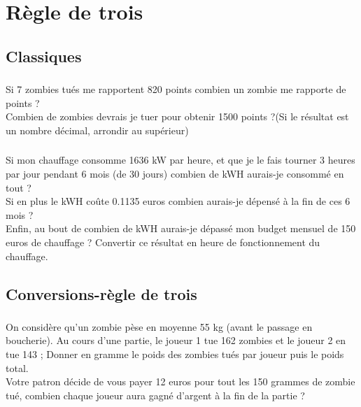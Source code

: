 \documentclass[a4paper,10pt]{article}
\newcommand{\subsub}{\subsubsection}
\newcommand{\sub}{\subsection}
\begin{document}
\section{Règle de trois }
\sub{Classiques}
\subsub{}
Si 7 zombies tués me rapportent 820 points combien un zombie me rapporte de points ?\\
Combien de zombies devrais je tuer pour obtenir 1500 points ?(Si le résultat est un nombre décimal, arrondir au supérieur)

\subsub{}
Si mon chauffage consomme 1636 kW par heure, et que je le fais tourner 3 heures par jour pendant 6 mois (de 30 jours) combien de kWH aurais-je consommé en tout ?\\
Si en plus le kWH coûte 0.1135 euros combien aurais-je dépensé à la fin de ces 6 mois ?\\
Enfin, au bout de combien de kWH aurais-je dépassé mon budget mensuel de 150 euros de chauffage ? Convertir ce résultat en heure de fonctionnement du chauffage.

\sub{Conversions-règle de trois}
\subsub{}
On considère qu'un zombie pèse en moyenne 55 kg (avant le passage en boucherie). Au cours d'une partie, le joueur 1 tue 162 zombies et le joueur 2 en tue 143 ; Donner en gramme le poids des zombies tués par joueur puis le poids total.\\
Votre patron décide de vous payer 12 euros pour tout les 150 grammes de zombie tué, combien chaque joueur aura gagné d'argent à la fin de la partie ? 
\end{document}
